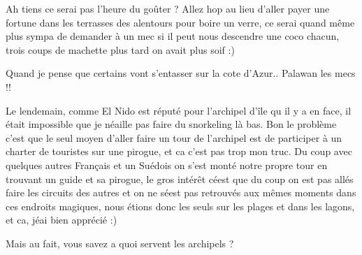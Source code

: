 \begin{multicols}{2}
Ah tiens ce serai pas l'heure du goûter ? Allez hop au lieu d'aller payer une fortune dans les terrasses des alentours pour boire un verre, ce serai quand même plus sympa de demander à un mec si il peut nous descendre une coco chacun, trois coups de machette plus tard on avait plus soif :)


Quand je pense que certains vont s'entasser sur la cote d'Azur.. Palawan les mecs !!


Le lendemain, comme El Nido est réputé pour l'archipel d'île qu il y a en face, il était impossible que je néaille pas faire du snorkeling là bas. Bon le problème c'est que le seul moyen d'aller faire un tour de l'archipel est de participer à un charter de touristes sur une pirogue, et ca c'est pas trop mon truc. Du coup avec quelques autres Français et un Suédois on s'est monté notre propre tour en trouvant un guide et sa pirogue, le gros intérêt céest que du coup on est pas allés faire les circuits des autres et on ne séest pas retrouvés aux mêmes moments dans ces endroits magiques, nous étions donc les seuls sur les plages et dans les lagons, et ca, jéai bien apprécié :)


Mais au fait, vous savez a quoi servent les archipels ?

\end{multicols}


